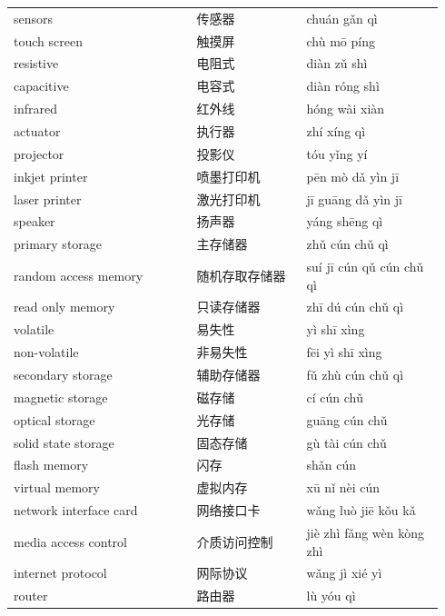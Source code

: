 \documentclass[11pt]{article}
\begin{document}
\begin{longtable}{@{}p{0.40\linewidth}p{0.24\linewidth}p{0.30\linewidth}@{}}
sensors & 传感器 & chuán gǎn qì \\
touch screen & 触摸屏 & chù mō píng \\
resistive & 电阻式 & diàn zǔ shì \\
capacitive & 电容式 & diàn róng shì \\
infrared & 红外线 & hóng wài xiàn \\
actuator & 执行器 & zhí xíng qì \\
projector & 投影仪 & tóu yǐng yí \\
inkjet printer & 喷墨打印机 & pēn mò dǎ yìn jī \\
laser printer & 激光打印机 & jī guāng dǎ yìn jī \\
speaker & 扬声器 & yáng shēng qì \\
primary storage & 主存储器 & zhǔ cún chǔ qì \\
random access memory & 随机存取存储器 & suí jī cún qǔ cún chǔ qì \\
read only memory & 只读存储器 & zhī dú cún chǔ qì \\
volatile & 易失性 & yì shī xìng \\
non-volatile & 非易失性 & fēi yì shī xìng \\
secondary storage & 辅助存储器 & fǔ zhù cún chǔ qì \\
magnetic storage & 磁存储 & cí cún chǔ \\
optical storage & 光存储 & guāng cún chǔ \\
solid state storage & 固态存储 & gù tài cún chǔ \\
flash memory & 闪存 & shǎn cún \\
virtual memory & 虚拟内存 & xū nǐ nèi cún \\
network interface card & 网络接口卡 & wǎng luò jiē kǒu kǎ \\
media access control & 介质访问控制 & jiè zhì fǎng wèn kòng zhì \\
internet protocol & 网际协议 & wǎng jì xié yì \\
router & 路由器 & lù yóu qì \\
\end{longtable}
\end{document}
